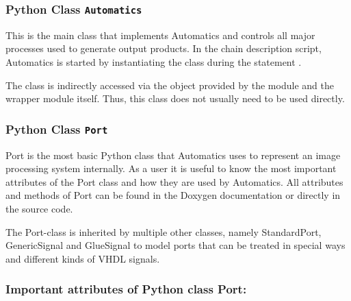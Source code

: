 \subsubsection{Python Class \texttt{Automatics}}

This is the main class that implements Automatics and controls all major processes used to generate output products.
In the chain description script, Automatics is started by instantiating the  class during the statement .

The class is indirectly accessed via the  object provided by the  module and the  wrapper module itself.
Thus, this class does not usually need to be used directly.

\subsubsection{Python Class \texttt{Port}}
\label{ssec:06-02-class_port}

Port is the most basic Python class that Automatics uses to represent an image processing system internally.
As a user it is useful to know the most important attributes of the Port class and how they are used by Automatics.
All attributes and methods of Port can be found in the Doxygen documentation or directly in the source code.

The Port-class is inherited by multiple other classes, namely StandardPort, GenericSignal and GlueSignal to model ports that can be treated in special ways and different kinds of VHDL signals.

\subsubsection*{Important attributes of Python class Port:}

